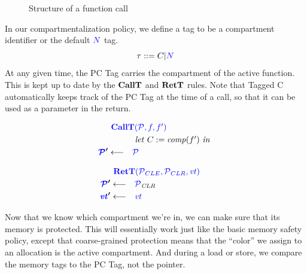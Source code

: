 \documentclass[acmsmall,review,anonymous]{acmart}\settopmatter{printfolios=true,printccs=false,printacmref=false}
\begin{document}
\begin{figure}

  \caption{Structure of a function call}
  \label{fig:functions}
\end{figure}

In our compartmentalization policy, we define a tag to be a compartment identifier or
the default \({\color{blue} N}\) tag.
%
\[\tau ::= C | {\color{blue} N}\]
%
At any given time, the PC Tag carries the compartment of the active function.
This is kept up to date by the \(\mathbf{CallT}\) and \(\mathbf{RetT}\) rules. Note that
Tagged C automatically keeps track of the PC Tag at the time of a call, so that
it can be used as a parameter in the return.

\begin{minipage}[t]{.49\textwidth}
  \[\begin{aligned}
  \truledef{\callt}
  \letin{C := \mathit{comp}(f')}
  \settag{\PCT'}{\PCT}
  \end{aligned}\]
\end{minipage}
\begin{minipage}[t]{.49\textwidth}
  \[\begin{aligned}
  \truledef{\rett}
  \settag{\PCT'}{\PCT_{CLR}}
  \settag{\vt'}{\vt}
  \end{aligned}\]
\end{minipage}

Now that we know which compartment we're in, we can make sure that its memory is protected.
This will essentially work just like the basic memory safety policy, except that coarse-grained
protection means that the ``color'' we assign to an allocation is the active compartment.
And during a load or store, we compare the memory tags to the PC Tag, not the pointer.
\end{document}
